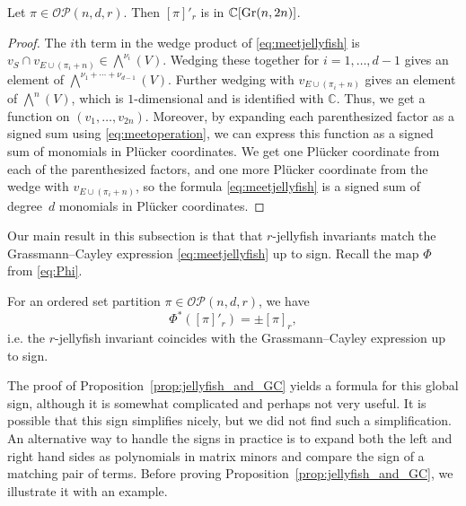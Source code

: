 \documentclass[ALCO, Unicode]{cedram}
\numberwithin{equation}{section}
\newcommand{\ordsetpart}{\mathcal{OP}}
\begin{document}
\begin{lemma}
   Let $\pi \in \ordsetpart(n,d,r)$. Then $[\pi]'_r$ is in $\mathbb{C}[{\rm Gr}(n,2n)]$.
\end{lemma}
\begin{proof}
The $i$th term in the wedge product of \eqref{eq:meetjellyfish} is $ v_{S} \cap v_{E \cup (\pi_i+n)} \in \bigwedge^{\nu_i}(V)$. Wedging these together for $i=1,\dots,d-1$ gives an element of $\bigwedge^{\nu_1+\cdots +\nu_{d-1}}(V)$. Further wedging with $v_{E \cup (\pi_i+n)}$ gives an element of 
$\bigwedge^{n}(V)$, which is $1$-dimensional and is identified with $\mathbb{C}$. Thus, we get a function on $(v_1,\dots,v_{2n})$. Moreover, by expanding each parenthesized factor as a signed sum using \eqref{eq:meetoperation}, we can express this function as a signed sum of monomials in Pl\"ucker coordinates. We get one Pl\"ucker coordinate from each of the parenthesized factors, and one more Pl\"ucker coordinate from the wedge with $v_{E \cup (\pi_i+n)}$, so the formula \eqref{eq:meetjellyfish} is a signed sum of degree~$d$ monomials in Pl\"ucker coordinates. 
\end{proof}

Our main result in this subsection is that that $r$-jellyfish invariants match the Grassmann--Cayley expression \eqref{eq:meetjellyfish} up to sign. Recall the map $\Phi$ from \eqref{eq:Phi}.
\begin{proposition}\label{prop:jellyfish_and_GC}
For an ordered set partition $\pi \in \ordsetpart(n,d,r)$, we have 
$$\Phi^*([\pi]'_r) = \pm [\pi]_r,$$
i.e. the $r$-jellyfish invariant coincides with the Grassmann--Cayley expression up to sign.
\end{proposition}

The proof of Proposition~\ref{prop:jellyfish_and_GC} yields a formula for this global sign, although it is somewhat complicated and perhaps not very useful. It is possible that this sign simplifies nicely, but we did not find such a simplification. An alternative way to handle the signs in practice is to expand both the left and right hand sides as polynomials in matrix minors and compare the sign of a matching pair of terms. Before proving Proposition~\ref{prop:jellyfish_and_GC}, we illustrate it with an example. 
\end{document}
